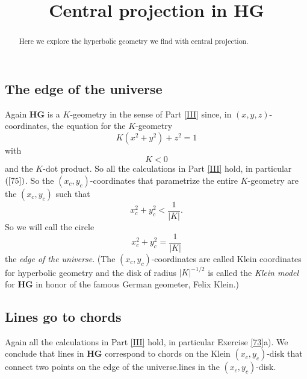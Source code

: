 \documentclass{ximera}
\title{Central projection in \textbf{HG}}
\begin{document}
\begin{abstract}
Here we explore the hyperbolic geometry we find with central projection. 
\end{abstract}
\maketitle


\subsection*{The edge of the universe}

Again \textbf{HG} is a $K$-geometry in the sense of Part \ref{III} since, in
$\left(  x,y,z\right)  $-coordinates, the equation for the $K$-geometry
\begin{equation}
K\left(  x^{2}+y^{2}\right)  +z^{2}=1 \label{74}%
\end{equation}
with%
\[
K<0
\]
and the $K$-dot product. So all the calculations in Part \ref{III} hold, in
particular $\left(  \ref{75}\right)  $. So the $\left(  x_{c},y_{c}\right)
$-coordinates that parametrize the entire $K$-geometry are the $\left(
x_{c},y_{c}\right)  $ such that%
\[
x_{c}^{2}+y_{c}^{2}<\frac{1}{\left\vert K\right\vert }.
\]
So we will call the circle%
\[
x_{c}^{2}+y_{c}^{2}=\frac{1}{\left\vert K\right\vert }%
\]
the \textit{edge of the universe}. (The $\left(  x_{c},y_{c}\right)
$-coordinates are called Klein coordinates for hyperbolic geometry and the
disk of radius $\left\vert K\right\vert ^{-1/2}$ is called the \textit{Klein
model} for \textbf{HG} in honor of the famous German geometer, Felix
Klein.)

\subsection*{Lines go to chords}

Again all the calculations in Part \ref{III} hold, in particular Exercise
\ref{73}a). We conclude that lines in \textbf{HG} correspond to chords on the
Klein $\left(  x_{c},y_{c}\right)  $-disk that connect two points on the edge
of the universe.lines in the $\left(  x_{c},y_{c}\right)  $-disk.
\end{document}
